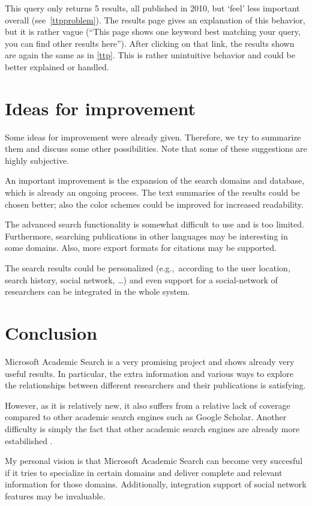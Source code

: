 \documentclass[12pt]{article}
\begin{document}
This query only returns 5 results, all published in 2010, but `feel' less important overall (see~\autoref{ttpproblem}). The results page gives an explanation of this behavior, but it is rather vague (``This page shows one keyword best matching your query, you can find other results here''). After clicking on that link, the results shown are again the same as in \autoref{ttp}. This is rather unintuitive behavior and could be better explained or handled.


\section{Ideas for improvement}
Some ideas for improvement were already given. Therefore, we try to summarize them and discuss some other possibilities. Note that some of these suggestions are highly subjective.

An important improvement is the expansion of the search domains and database, which is already an ongoing process.
The text summaries of the results could be chosen better; also the color schemes could be improved for increased readability. 

The advanced search functionality is somewhat difficult to use and is too limited. Furthermore, searching publications in other languages may be interesting in some domains. Also, more export formats for citations may be supported. 

The search results could be personalized (e.g.,~according to the user location, search history, social network, \ldots{}) and even support for a social-network of researchers can be integrated in the whole system. 

\section{Conclusion}
Microsoft Academic Search is a very promising project and shows already very useful results. In particular, the extra information and various ways to explore the relationships between different researchers and their publications is satisfying.

However, as it is relatively new, it also suffers from a relative lack of coverage compared to other academic search engines such as Google Scholar. Another difficulty is simply the fact that other academic search engines are already more estabilished \cite{pros}.

My personal vision is that Microsoft Academic Search can become very succesful if it tries to specialize in certain domains and deliver complete and relevant information for those domains. Additionally, integration support of social network features may be invaluable.
\end{document}
